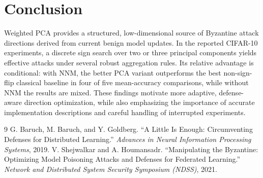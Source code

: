\documentclass[11pt,a4paper]{article}
\begin{document}
\section{Conclusion}
Weighted PCA provides a structured, low-dimensional source of Byzantine attack directions derived from current benign model updates. In the reported CIFAR-10 experiments, a discrete sign search over two or three principal components yields effective attacks under several robust aggregation rules. Its relative advantage is conditional: with NNM, the better PCA variant outperforms the best non-sign-flip classical baseline in four of five mean-accuracy comparisons, while without NNM the results are mixed. These findings motivate more adaptive, defense-aware direction optimization, while also emphasizing the importance of accurate implementation descriptions and careful handling of interrupted experiments.

\begin{thebibliography}{9}
 G. Baruch, M. Baruch, and Y. Goldberg. ``A Little Is Enough: Circumventing Defenses for Distributed Learning.'' \emph{Advances in Neural Information Processing Systems}, 2019.
 V. Shejwalkar and A. Houmansadr. ``Manipulating the Byzantine: Optimizing Model Poisoning Attacks and Defenses for Federated Learning.'' \emph{Network and Distributed System Security Symposium (NDSS)}, 2021.
\end{thebibliography}
\end{document}

